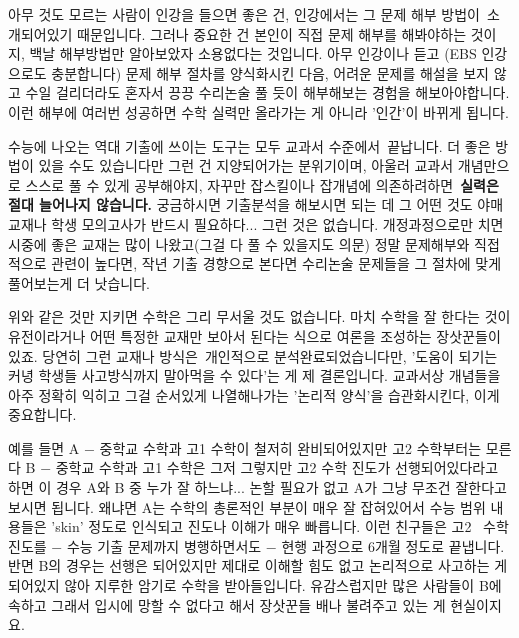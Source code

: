 아무 것도 모르는 사람이 인강을 들으면 좋은 건, 인강에서는 그 문제 해부 방법이 소개되어있기 때문입니다.
그러나 중요한 건 본인이 직접 문제 해부를 해봐야하는 것이지, 백날 해부방법만 알아보았자 소용없다는 것입니다.
아무 인강이나 듣고 (EBS 인강으로도 충분합니다) 문제 해부 절차를 양식화시킨 다음,
어려운 문제를 해설을 보지 않고 수일 걸리더라도 혼자서 끙끙 수리논술 풀 듯이 해부해보는 경험을 해보아야합니다.
이런 해부에 여러번 성공하면 수학 실력만 올라가는 게 아니라 '인간'이 바뀌게 됩니다.
\vspace{5mm}

수능에 나오는 역대 기출에 쓰이는 도구는 모두 교과서 수준에서 끝납니다.
더 좋은 방법이 있을 수도 있습니다만 그런 건 지양되어가는 분위기이며, 아울러 교과서 개념만으로 스스로 풀 수 있게 공부해야지,
자꾸만 잡스킬이나 잡개념에 의존하려하면 \textbf{실력은 절대 늘어나지 않습니다.}
궁금하시면 기출분석을 해보시면 되는 데 그 어떤 것도 야매 교재나 학생 모의고사가 반드시 필요하다... 그런 것은 없습니다.
개정과정으로만 치면 시중에 좋은 교재는 많이 나왔고(그걸 다 풀 수 있을지도 의문)
정말 문제해부와 직접적으로 관련이 높다면, 작년 기출 경향으로 본다면 수리논술 문제들을 그 절차에 맞게 풀어보는게 더 낫습니다.
\vspace{5mm}

위와 같은 것만 지키면 수학은 그리 무서울 것도 없습니다.
마치 수학을 잘 한다는 것이 유전이라거나 어떤 특정한 교재만 보아서 된다는 식으로 여론을 조성하는 장삿꾼들이 있죠.
당연히 그런 교재나 방식은 개인적으로 분석완료되었습니다만,
'도움이 되기는 커녕 학생들 사고방식까지 말아먹을 수 있다'는 게 제 결론입니다.
교과서상 개념들을 아주 정확히 익히고 그걸 순서있게 나열해나가는 '논리적 양식'을 습관화시킨다,
이게 중요합니다.
\vspace{5mm}

예를 들면
A $-$ 중학교 수학과 고1 수학이 철저히 완비되어있지만 고2 수학부터는 모른다
B $-$ 중학교 수학과 고1 수학은 그저 그렇지만 고2 수학 진도가 선행되어있다라고 하면
이 경우 A와 B 중 누가 잘 하느냐... 논할 필요가 없고 A가 그냥 무조건 잘한다고 보시면 됩니다.
왜냐면 A는 수학의 총론적인 부분이 매우 잘 잡혀있어서 수능 범위 내용들은 'skin' 정도로 인식되고 진도나 이해가 매우 빠릅니다.
이런 친구들은 고2  수학 진도를 $-$ 수능 기출 문제까지 병행하면서도 $-$ 현행 과정으로 6개월 정도로 끝냅니다.
반면 B의 경우는 선행은 되어있지만 제대로 이해할 힘도 없고 논리적으로 사고하는 게 되어있지 않아 지루한 암기로 수학을 받아들입니다.
유감스럽지만 많은 사람들이 B에 속하고 그래서 입시에 망할 수 없다고 해서 장삿꾼들 배나 불려주고 있는 게 현실이지요.
\vspace{5mm}

